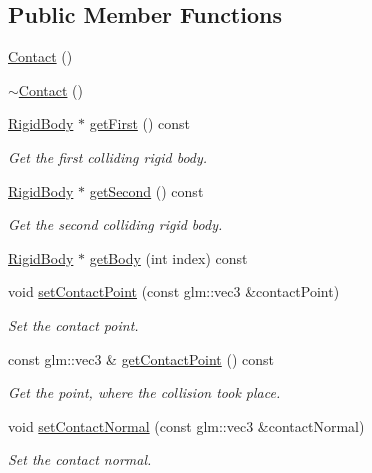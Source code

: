 \subsection*{Public Member Functions}
\begin{DoxyCompactItemize}
\item 
\mbox{\hyperlink{classr3_1_1_contact_af2648c9a1e37583ac230a40f4fc6b72d}{Contact}} ()
\item 
\mbox{\hyperlink{classr3_1_1_contact_a011905bfa1cfa3ed459650796b105c6a}{$\sim$\+Contact}} ()
\item 
\mbox{\hyperlink{classr3_1_1_rigid_body}{Rigid\+Body}} $\ast$ \mbox{\hyperlink{classr3_1_1_contact_adf157981ebfd1552521afe7b25e9239c}{get\+First}} () const
\begin{DoxyCompactList}\small\item\em Get the first colliding rigid body. \end{DoxyCompactList}\item 
\mbox{\hyperlink{classr3_1_1_rigid_body}{Rigid\+Body}} $\ast$ \mbox{\hyperlink{classr3_1_1_contact_a90af8f5c7cba65a6a84c57b5a6ef6d70}{get\+Second}} () const
\begin{DoxyCompactList}\small\item\em Get the second colliding rigid body. \end{DoxyCompactList}\item 
\mbox{\hyperlink{classr3_1_1_rigid_body}{Rigid\+Body}} $\ast$ \mbox{\hyperlink{classr3_1_1_contact_aaa7c4c676fd8f3b07f81cc18257c48d9}{get\+Body}} (int index) const
\item 
void \mbox{\hyperlink{classr3_1_1_contact_aedd044892a1adf0692b7cc9f81b4436a}{set\+Contact\+Point}} (const glm\+::vec3 \&contact\+Point)
\begin{DoxyCompactList}\small\item\em Set the contact point. \end{DoxyCompactList}\item 
const glm\+::vec3 \& \mbox{\hyperlink{classr3_1_1_contact_a9558ff3dd4e2c5331fc05076e4e503a0}{get\+Contact\+Point}} () const
\begin{DoxyCompactList}\small\item\em Get the point, where the collision took place. \end{DoxyCompactList}\item 
void \mbox{\hyperlink{classr3_1_1_contact_af7866e211b169ce6565d3f37af8ef8d7}{set\+Contact\+Normal}} (const glm\+::vec3 \&contact\+Normal)
\begin{DoxyCompactList}\small\item\em Set the contact normal. \end{DoxyCompactList}\item 

\end{DoxyCompactItemize}
